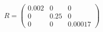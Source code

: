 \[
R = \begin{pmatrix}
    0.002 & 0 & 0\\
    0 & 0.25 & 0\\
    0 & 0 & 0.00017
    \end{pmatrix}
\]
